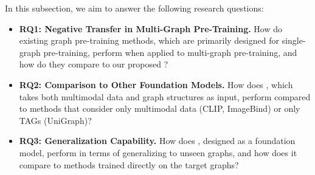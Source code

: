  In this subsection, we aim to answer the following research questions: 
\begin{itemize}[leftmargin=*,itemsep=0pt,parsep=0.2em,topsep=0.3em,partopsep=0.3em]
    \item \textbf{RQ1: Negative Transfer in Multi-Graph Pre-Training.} How do existing graph pre-training methods, which are primarily designed for single-graph pre-training, perform when applied to multi-graph pre-training, and how do they compare to our proposed \model?
    \item \textbf{RQ2: Comparison to Other Foundation Models.} How does \model, which takes both multimodal data and graph structures as input, perform compared to methods that consider only multimodal data (CLIP, ImageBind) or only TAGs (UniGraph)?
    \item \textbf{RQ3: Generalization Capability.} How does \model, designed as a foundation model, perform in terms of generalizing to unseen graphs, and how does it compare to methods trained directly on the target graphs?
\end{itemize}

